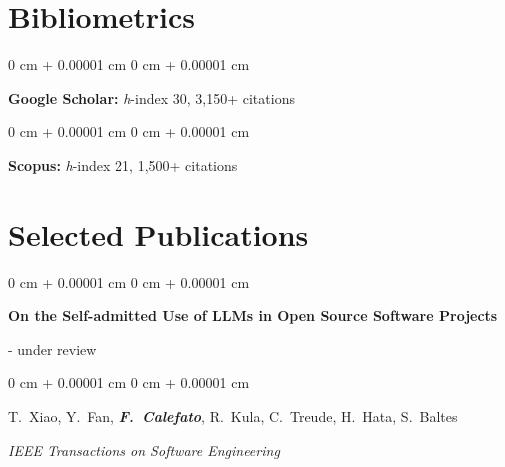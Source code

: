 \documentclass[10pt, a4paper]{article}
\newenvironment{onecolentry}{
    \begin{adjustwidth}{
        0 cm + 0.00001 cm
    }{
        0 cm + 0.00001 cm
    }
}{
    \end{adjustwidth}
} %
\newenvironment{twocolentry}[2][]{
    \onecolentry
    \def\secondColumn{#2}
    \setcolumnwidth{\fill, 4.5 cm}
    \begin{paracol}{2}
}{
    \switchcolumn \raggedleft \secondColumn
    \end{paracol}
    \endonecolentry
} %
\begin{document}
    
    \section{Bibliometrics}



        
        \begin{onecolentry}
            \textbf{Google Scholar:} \textit{h}-index 30, 3,150+ citations
        \end{onecolentry}

        \vspace{0.2 cm}

        \begin{onecolentry}
            \textbf{Scopus:} \textit{h}-index 21, 1,500+ citations
        \end{onecolentry}


    
    \section{Selected Publications}



        
        \begin{samepage}
            \begin{twocolentry}{
                2025 - under review
            }
                \textbf{On the Self-admitted Use of LLMs in Open Source Software Projects}
            \end{twocolentry}

            \vspace{0.10 cm}
            
            \begin{onecolentry}
                \mbox{T. Xiao}, \mbox{Y. Fan}, \mbox{\textbf{\textit{F. Calefato}}}, \mbox{R. Kula}, \mbox{C. Treude}, \mbox{H. Hata}, \mbox{S. Baltes}

                \vspace{0.10 cm}
                
        \textit{IEEE Transactions on Software Engineering}\end{onecolentry}
        \end{samepage}

        \vspace{0.2 cm}
\end{document}
